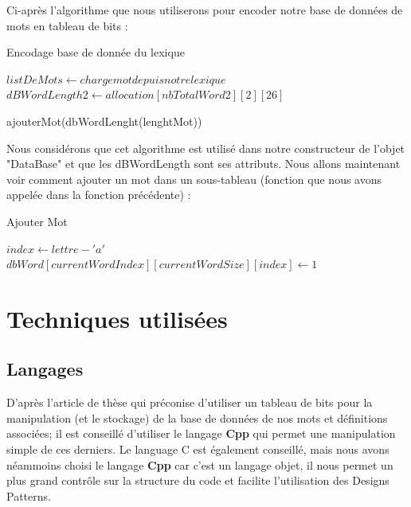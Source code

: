 \documentclass [ 11 pt ] {article}
\begin{document}
    Ci-après l'algorithme que nous utiliserons pour encoder notre base de données de mots en tableau de bits :
        
    \begin{algorithm}[H]
    \caption{Encodage base de donnée du lexique}\label{alg:cap}
    
    \begin{algorithmic} 
    \State $listDeMots\gets charge mot depuis notre lexique$
    \State $dBWordLength2 \gets allocation[nbTotalWord2][2][26]$ 
    
        ajouterMot(dbWordLenght(lenghtMot))
    \EndFor
    
    \end{algorithmic}
    \end{algorithm}
    
    Nous considérons que cet algorithme est utilisé dans notre constructeur de l'objet "DataBase" et que les dBWordLength sont ses attributs. Nous allons maintenant voir comment ajouter un mot dans un sous-tableau (fonction que nous avons appelée dans la fonction précédente) : 
    
    \begin{algorithm}
    \caption{Ajouter Mot}\label{alg:cap}
    
    \begin{algorithmic} 
    
        \State $index \gets lettre -'a'$
        \State $dbWord[currentWordIndex][currentWordSize][index] \gets 1 $
    \EndFor
    
    \end{algorithmic}
    \end{algorithm}
    

\newpage

\section{Techniques utilisées}

    \subsection{Langages}
    D'après l'article de thèse \cite{Cpc} qui préconise d'utiliser un tableau de bits pour la manipulation (et le stockage) de la base de données de nos mots et définitions associées; il est conseillé d'utiliser le langage \textbf{Cpp} qui permet une manipulation simple de ces derniers. Le language C est également conseillé, mais nous avons néammoins choisi le langage \textbf{Cpp} car c'est un langage objet, il nous permet un plus grand contrôle sur la structure du code et facilite l'utilisation des Designs Patterns.%
\end{document}

